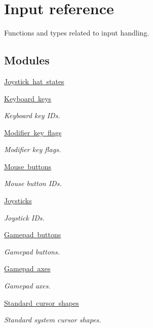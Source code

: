 \hypertarget{group__input}{}\section{Input reference}
\label{group__input}


Functions and types related to input handling.  


\subsection*{Modules}
\begin{DoxyCompactItemize}
\item 
\mbox{\hyperlink{group__hat__state}{Joystick hat states}}
\item 
\mbox{\hyperlink{group__keys}{Keyboard keys}}
\begin{DoxyCompactList}\small\item\em Keyboard key I\+Ds. \end{DoxyCompactList}\item 
\mbox{\hyperlink{group__mods}{Modifier key flags}}
\begin{DoxyCompactList}\small\item\em Modifier key flags. \end{DoxyCompactList}\item 
\mbox{\hyperlink{group__buttons}{Mouse buttons}}
\begin{DoxyCompactList}\small\item\em Mouse button I\+Ds. \end{DoxyCompactList}\item 
\mbox{\hyperlink{group__joysticks}{Joysticks}}
\begin{DoxyCompactList}\small\item\em Joystick I\+Ds. \end{DoxyCompactList}\item 
\mbox{\hyperlink{group__gamepad__buttons}{Gamepad buttons}}
\begin{DoxyCompactList}\small\item\em Gamepad buttons. \end{DoxyCompactList}\item 
\mbox{\hyperlink{group__gamepad__axes}{Gamepad axes}}
\begin{DoxyCompactList}\small\item\em Gamepad axes. \end{DoxyCompactList}\item 
\mbox{\hyperlink{group__shapes}{Standard cursor shapes}}
\begin{DoxyCompactList}\small\item\em Standard system cursor shapes. \end{DoxyCompactList}\end{DoxyCompactItemize}
